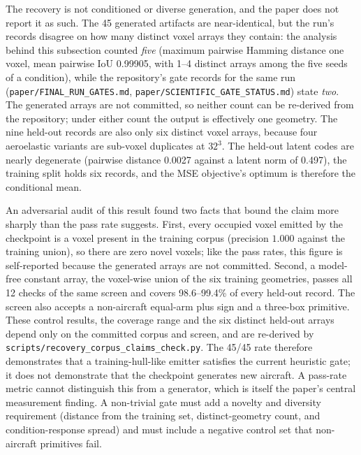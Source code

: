 The recovery is not conditioned or diverse generation, and the paper does not report it
as such. The 45 generated artifacts are near-identical, but the run's records disagree on
how many distinct voxel arrays they contain: the analysis behind this subsection counted
\emph{five} (maximum pairwise Hamming distance one voxel, mean pairwise IoU 0.99905, with
1--4 distinct arrays among the five seeds of a condition), while the repository's gate
records for the same run (\texttt{paper/FINAL\_RUN\_GATES.md},
\texttt{paper/SCIENTIFIC\_GATE\_STATUS.md}) state \emph{two}. The generated arrays are not
committed, so neither count can be re-derived from the repository; under either count
the output is effectively one geometry. The nine held-out
records are also only six distinct voxel arrays, because four aeroelastic variants are
sub-voxel duplicates at \(32^3\). The held-out latent codes are nearly degenerate
(pairwise distance 0.0027 against a latent norm of 0.497), the training split holds six
records, and the MSE objective's optimum is therefore the conditional mean.

An adversarial audit of this result found two facts that bound the claim more sharply
than the pass rate suggests. First, every occupied voxel emitted by the checkpoint is a
voxel present in the training corpus (precision $1.000$ against the training union), so
there are zero novel voxels; like the pass rates, this figure is self-reported because
the generated arrays are not committed. Second, a model-free constant array, the
voxel-wise union of the six training geometries, passes all 12 checks of the same screen
and covers 98.6--99.4\% of every held-out record. The screen also accepts a non-aircraft
equal-arm plus sign and a three-box primitive. These control results, the coverage range
and the six distinct held-out arrays depend only on the committed corpus and screen, and
are re-derived by \texttt{scripts/recovery\_corpus\_claims\_check.py}. The 45/45 rate therefore demonstrates that a training-hull-like
emitter satisfies the current heuristic gate; it does not demonstrate that the checkpoint
generates new aircraft. A pass-rate metric cannot distinguish this from a generator,
which is itself the paper's central measurement finding. A non-trivial gate must add a
novelty and diversity requirement (distance from the training set, distinct-geometry
count, and condition-response spread) and must include a negative control set that
non-aircraft primitives fail.
